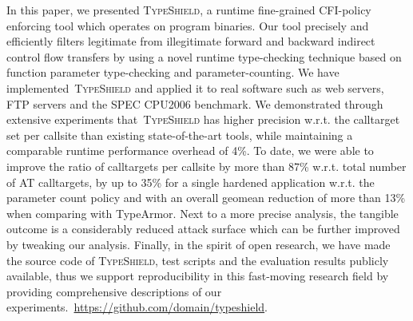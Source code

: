 In this paper, we presented \textsc{TypeShield}, a runtime fine-grained CFI-policy enforcing tool which 
operates on program binaries. Our tool precisely and efficiently filters legitimate from 
illegitimate forward and backward indirect control flow transfers by using a novel runtime type-checking 
technique based on function parameter type-checking and parameter-counting. 
We have implemented~\textsc{TypeShield} and applied it to real software such as web servers, FTP servers and the SPEC CPU2006 benchmark. 
We demonstrated through extensive experiments that~\textsc{TypeShield} has 
higher precision w.r.t. the calltarget set per callsite than existing state-of-the-art tools, while maintaining a comparable runtime performance overhead of 4\%. 
To date, we were able to improve the ratio of calltargets per callsite by more than 87\% w.r.t. total number of AT calltargets, 
by up to 35\% for a single hardened application w.r.t. the parameter count policy and with an overall geomean reduction of more than 13\% when comparing with TypeArmor.
Next to a more precise analysis, the tangible outcome is a considerably reduced attack surface which can be further improved by 
tweaking our analysis. Finally, in the spirit of open research, we have made the source code of \textsc{TypeShield}, test scripts and the evaluation results publicly available, 
thus we support reproducibility in this fast-moving research field by providing comprehensive descriptions of our experiments.~\url{https://github.com/domain/typeshield}.


